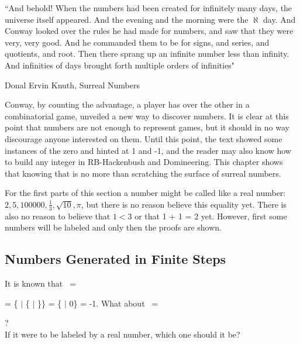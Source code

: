 \epigraph{``And behold! When the numbers had been created for infinitely many days, the universe itself appeared. And the evening and the morning were the $\aleph$ day. And Conway looked over the rules he had made for numbers, and saw that they were very, very good. And he commanded them to be for signs, and series, and quotients, and root. Then there sprang up an infinite number less than infinity. And infinities of days brought forth multiple orders of infinities"}{Donal Ervin Knuth, Surreal Numbers \footnotemark}



Conway, by counting the advantage, a player has over the other in a combinatorial game, unveiled a new way to discover numbers. It is clear at this point that numbers are not enough to represent games, but it should in no way discourage anyone interested on them. Until this point, the text showed some instances of the zero and hinted at 1 and -1, and the reader may also know how to build any integer in RB-Hackenbush and Domineering. This chapter shows that knowing that is no more than scratching the surface of surreal numbers.

For the first parts of this section a number  might be called like a real number: $2, 5, 100000, \frac{1}{3}, \sqrt{10}, \pi$, but there is no reason believe this equality yet. There is also no reason to believe that $1 < 3$ or that 1 + 1 = 2 yet. However, first some numbers will be labeled and only then the proofs are shown.


\subsection*{Numbers Generated in Finite Steps}

It is known that \Gm\ =
 = \{ $|$ \{ $|$ \}\} = \{ $|$ 0\} = -1.
What about \Hm\ =  ?\\ If it were to be labeled by a real number, which one should it be?


